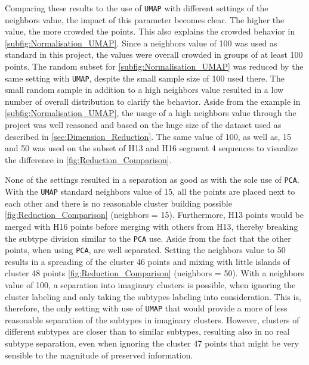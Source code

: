 \vspace{1em}

Comparing these results to the use of \texttt{UMAP} with different settings of the neighbors value, the impact of this parameter becomes clear. The higher the value, the more crowded the points. This also explains the crowded behavior in \autoref{subfig:Normalisation_UMAP}. Since a neighbors value of 100 was used as standard in this project, the values were overall crowded in groups of at least 100 points. The random subset for \autoref{subfig:Normalisation_UMAP} was reduced by the same setting with \texttt{UMAP}, despite the small sample size of 100 used there. The small random sample in addition to a high neighbors value resulted in a low number of overall distribution to clarify the behavior. Aside from the example in \autoref{subfig:Normalisation_UMAP}, the usage of a high neighbors value through the project was well reasoned and based on the huge size of the dataset used as described in \autoref{sec:Dimension_Reduction}. The same value of 100, as well as, 15 and 50 was used on the subset of H13 and H16 segment 4 sequences to visualize the difference in \autoref{fig:Reduction_Comparison}. 

\vspace{1em}

None of the settings resulted in a separation as good as with the sole use of \texttt{PCA}. With the \texttt{UMAP} standard neighbors value of 15, all the points are placed next to each other and there is no reasonable cluster building possible \autoref{fig:Reduction_Comparison} (neighbors = 15). Furthermore, H13 points would be merged with H16 points before merging with others from H13, thereby breaking the subtype division similar to the \texttt{PCA} use. Aside from the fact that the other points, when using \texttt{PCA}, are well separated. Setting the neighbors value to 50 results in a spreading of the cluster 46 points and mixing with little islands of cluster 48 points \autoref{fig:Reduction_Comparison} (neighbors = 50). With a neighbors value of 100, a separation into imaginary clusters is possible, when ignoring the cluster labeling and only taking the subtypes labeling into consideration. This is, therefore, the only setting with use of \texttt{UMAP} that would provide a more of less reasonable separation of the subtypes in imaginary clusters. However, clusters of different subtypes are closer than to similar subtypes, resulting also in no real subtype separation, even when ignoring the cluster 47 points that might be very sensible to the magnitude of preserved information.

